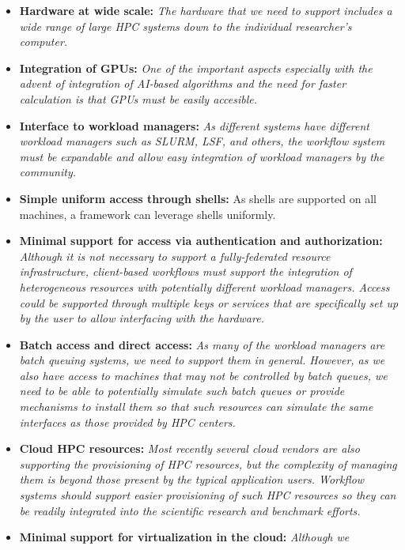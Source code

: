 \documentclass[sigconf]{acmart}
\begin{document}
\begin{BOX}

\begin{itemize}
\item {\bf Hardware at wide scale:} {\it The hardware that we need to
    support includes a wide range of large HPC systems down to the individual researcher's computer.}
\item {\bf Integration of GPUs:} {\it One of the important aspects especially with the advent of integration of AI-based algorithms and the need for faster calculation is that GPUs must be easily accesible.}
\item {\bf Interface to workload managers:} {\it As different systems
    have different workload managers such as SLURM, LSF, and others, the workflow system must be expandable and allow easy
    integration of workload managers by the community.} 
\item {\bf Simple uniform access through shells:} As shells are supported on all machines, a framework can leverage shells uniformly. 
\item {\bf Minimal support for access via authentication and authorization:} {\it Although it is not
    necessary to support a fully-federated resource infrastructure,
    client-based workflows must support the integration of
    heterogeneous resources with potentially different workload
    managers. Access could be supported through multiple keys or
    services that are specifically set up by the user to allow
    interfacing with the hardware.}
\item {\bf Batch access and direct access:} {\it As many of the
    workload managers are batch queuing systems, we need to support
    them in general. However, as we also have access to machines that
    may not be controlled by batch queues, we need to be able to
    potentially simulate such batch queues or provide mechanisms to
    install them so that such resources can simulate the same
    interfaces as those provided by HPC centers.}
 \item {\bf Cloud HPC resources:} {\it Most recently several cloud
     vendors are also supporting the provisioning of HPC resources,
     but the complexity of managing them is beyond those present by the
     typical application users. Workflow systems should support
     easier provisioning of such HPC resources so they can be readily
     integrated into the scientific research and benchmark efforts.}
\item {\bf Minimal support for virtualization in the cloud:} {\it Although we
}
\end{itemize}
\end{BOX}
\end{document}
